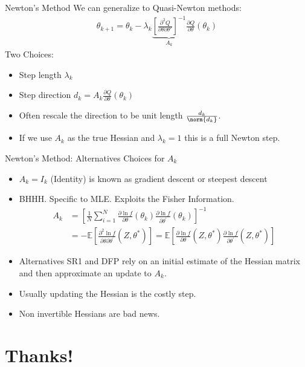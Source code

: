 \documentclass[aspectratio=169,11pt]{beamer}
\begin{document}
\begin{frame}{Newton's Method}
We can generalize to Quasi-Newton methods:
\begin{align*}
\theta_{k+1} = \theta_k -  \lambda_k \underbrace{\left[ \frac{\partial^2 Q}{\partial \theta \partial \theta'} \right]^{-1}}_{A_k} \frac{\partial Q}{\partial \theta}(\theta_k)
\end{align*}
Two Choices:
\begin{itemize}
\item Step length $\lambda_k$
\item Step direction $d_k=A_k \frac{\partial Q}{\partial \theta}(\theta_k)$
\item Often rescale the direction to be unit length $\frac{d_k}{\norm{d_k}}$.
\item If we use $A_k$ as the true Hessian and $\lambda_k=1$ this is a \alert{full Newton step}.
\end{itemize}
\end{frame}

\begin{frame}{Newton's Method: Alternatives}
Choices for $A_k$
\begin{itemize}
\item $A_k= I_{k}$ (Identity) is known as \alert{gradient descent} or \alert{steepest descent}
\item BHHH. Specific to MLE. Exploits the \alert{Fisher Information}.
\begin{align*}
A _ { k } 
&= \left[ \frac { 1 } { N } \sum _ { i = 1 } ^ { N } \frac { \partial \ln f } { \partial \theta } \left( \theta _ { k } \right) \frac { \partial \ln f } { \partial \theta ^ { \prime } } \left( \theta _ { k } \right) \right] ^ { - 1 }\\
&=- \mathbb { E } \left[ \frac { \partial ^ { 2 } \ln f } { \partial \theta \partial \theta ^ { \prime } } \left( Z , \theta ^ { * } \right) \right] 
= \mathbb { E } \left[ \frac { \partial \ln f } { \partial \theta } \left( Z , \theta ^ { * } \right) \frac { \partial \ln f } { \partial \theta ^ { \prime } } \left( Z , \theta ^ { * } \right) \right]
\end{align*}
\item Alternatives \alert{SR1} and \alert{DFP} rely on an initial estimate of the Hessian matrix and then approximate an update to $A_k$.
\item Usually updating the Hessian is the costly step.
\item Non invertible Hessians are bad news.
\end{itemize}
\end{frame}


\section*{Thanks!}
\end{document}
